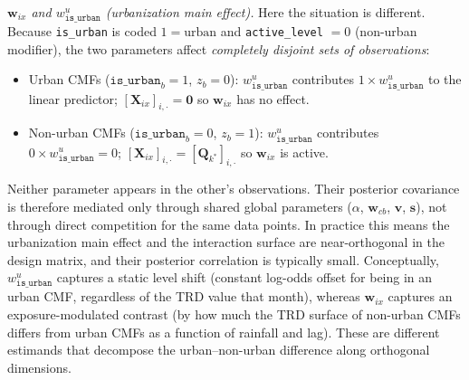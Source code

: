 \documentclass[12pt,a4paper]{article}
\begin{document}
\smallskip\noindent\textit{$\mathbf{w}_{ix}$ and $w^u_{\texttt{is\_urban}}$ (urbanization main effect).}
Here the situation is different. Because \texttt{is\_urban} is coded $1 = \text{urban}$ and \texttt{active\_level} $= 0$ (non-urban modifier), the two parameters affect \emph{completely disjoint sets of observations}:
\begin{itemize}
  \item Urban CMFs ($\texttt{is\_urban}_b = 1$, $z_b = 0$): $w^u_{\texttt{is\_urban}}$ contributes $1 \times w^u_{\texttt{is\_urban}}$ to the linear predictor; $[\mathbf{X}_{ix}]_{i,\cdot} = \mathbf{0}$ so $\mathbf{w}_{ix}$ has no effect.
  \item Non-urban CMFs ($\texttt{is\_urban}_b = 0$, $z_b = 1$): $w^u_{\texttt{is\_urban}}$ contributes $0 \times w^u_{\texttt{is\_urban}} = 0$; $[\mathbf{X}_{ix}]_{i,\cdot} = [\mathbf{Q}_{k^*}]_{i,\cdot}$ so $\mathbf{w}_{ix}$ is active.
\end{itemize}
Neither parameter appears in the other's observations. Their posterior covariance is therefore mediated only through shared global parameters ($\alpha$, $\mathbf{w}_{cb}$, $\mathbf{v}$, $\mathbf{s}$), not through direct competition for the same data points. In practice this means the urbanization main effect and the interaction surface are near-orthogonal in the design matrix, and their posterior correlation is typically small. Conceptually, $w^u_{\texttt{is\_urban}}$ captures a static level shift (constant log-odds offset for being in an urban CMF, regardless of the TRD value that month), whereas $\mathbf{w}_{ix}$ captures an exposure-modulated contrast (by how much the TRD surface of non-urban CMFs differs from urban CMFs as a function of rainfall and lag). These are different estimands that decompose the urban--non-urban difference along orthogonal dimensions.
\end{document}
